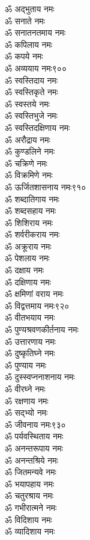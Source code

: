 \begin{multicols}{2}
\begin{flushleft}
ॐ अद्भुताय नमः\\
ॐ सनाते नमः\\
ॐ सनातनतमाय नमः\\
ॐ कपिलाय नमः\\
ॐ कपये नमः\\
ॐ अव्ययाय नमः\hfill ९००\\
ॐ स्वस्तिदाय नमः\\
ॐ स्वस्तिकृते नमः\\
ॐ स्वस्तये नमः\\
ॐ स्वस्तिभुजे नमः\\
ॐ स्वस्तिदक्षिणाय नमः\\
ॐ अरौद्राय नमः\\
ॐ कुण्डलिने नमः\\
ॐ चक्रिणे नमः\\
ॐ विक्रमिणे नमः\\
ॐ ऊर्जितशासनाय नमः\hfill ९१०\\
ॐ शब्दातिगाय नमः\\
ॐ शब्दसहाय नमः\\
ॐ शिशिराय नमः\\
ॐ शर्वरीकराय नमः\\
ॐ अक्रूराय नमः\\
ॐ पेशलाय नमः\\
ॐ दक्षाय नमः\\
ॐ दक्षिणाय नमः\\
ॐ क्षमिणां वराय नमः\\
ॐ विद्वत्तमाय नमः\hfill ९२०\\
ॐ वीतभयाय नमः\\
ॐ पुण्यश्रवणकीर्तनाय नमः\\
ॐ उत्तारणाय नमः\\
ॐ दुष्कृतिघ्ने नमः\\
ॐ पुण्याय नमः\\
ॐ दुस्स्वप्ननाशनाय नमः\\
ॐ वीरघ्ने नमः\\
ॐ रक्षणाय नमः\\
ॐ सद्भ्यो  नमः\\
ॐ जीवनाय नमः\hfill ९३०\\
ॐ पर्यवस्थिताय नमः\\
ॐ अनन्तरूपाय नमः\\
ॐ अनन्तश्रिये नमः\\
ॐ जितमन्यवे नमः\\
ॐ भयापहाय नमः\\
ॐ चतुरश्राय नमः\\
ॐ गभीरात्मने नमः\\
ॐ विदिशाय नमः\\
ॐ व्यादिशाय नमः\\

\end{flushleft}
\end{multicols}
